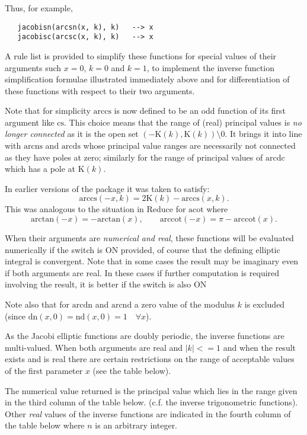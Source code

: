 Thus, for example,
\begin{verbatim}
   jacobisn(arcsn(x, k), k)   --> x
   jacobisc(arcsc(x, k), k)   --> x
\end{verbatim}

A rule list is provided to simplify these functions for special values of their
arguments such $x=0$, $k=0$ and $k=1$, to implement the inverse function
simplification formulae illustrated immediately above and for differentiation
of these functions with respect to their two arguments.

Note that for simplicity $ \mathrm{arccs}$ is now defined to be an odd
function of its first argument like $\mathrm{cs}$.
This choice means that the range of (real) principal values is
\emph{no longer connected} as it is the open set
$(-\mathrm{K}(k), \mathrm{K}(k)) \setminus 0$.
It brings it into line with $\mathrm{arcns}$ and
$\mathrm{arcds}$ whose principal value ranges are necessarily not connected
as they have poles at zero;
similarly for the range of principal values of $\mathrm{arcdc}$ which has
a pole at $\mathrm{K}(k)$.
  
In earlier versions of the package it was taken to satisfy:
\[ \mathrm{arccs}(-x, k) = 2\mathrm{K}(k)-\mathrm{arccs}(x, k).\]
This was analogous to the situation in Reduce for $\mathrm{acot}$ where
\[ \mathrm{arctan}(-x) = -\mathrm{arctan}(x),\qquad
  \mathrm{arccot}(-x) = \pi -\mathrm{arccot}(x). \]

When their arguments are \emph{numerical and real}, these functions will be
evaluated numerically if the  switch is ON provided, of course that
the defining elliptic integral is convergent. Note that in some cases the result
may be imaginary even if both arguments are real. In these cases if further computation
is required involving the result, it is better if the switch  is also ON

Note also that for $\mathrm{arcdn}$ and $\mathrm{arcnd}$ a zero value of the modulus $k$
is excluded (since $\mathrm{dn}(x,0) = \mathrm{nd}(x,0) = 1 \quad \forall x$).

As the Jacobi elliptic functions are doubly periodic, the inverse functions
are multi-valued. When both arguments are real and $|k|<=1$ and when the
result exists and is real there are certain restrictions on the range of
acceptable values of the first parameter $x$ (see the table below).

The numerical value returned is the principal value which
lies in the range  given in the third column of the table below. 
(c.f. the inverse trigonometric functions). Other \emph{real} values of the
inverse functions are indicated in the fourth column of the table below where
$n$ is an arbitrary integer.

